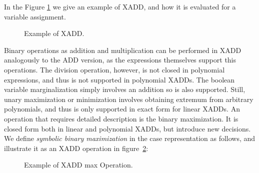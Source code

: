 In the Figure \ref{fig:xaddex} we give an example of XADD, and how it is evaluated for a variable assignment.

\begin{figure}[h!t]
\center
{}
\caption{ Example of XADD.}
\label{fig:xaddex} 
\end{figure}

Binary operations as addition and multiplication can be performed in XADD analogously  to the ADD version, as the expressions themselves support this operations. The division operation, however, is not closed in polynomial expressions, and thus is not supported in polynomial XADDs. The boolean variable marginalization simply involves an addition so is also supported. Still, unary maximization or minimization involves obtaining extremum from arbitrary polynomials, and thus is only supported in exact form for linear XADDs. An operation that requires detailed description is the binary maximization. It is closed form both in linear and polynomial XADDs, but introduce new decisions. We define \emph{symbolic binary maximization} in the case representation as follows, and illustrate it as an XADD operation in figure~\ref{fig:xaddmax}:

\begin{figure}[h!t]
\center
{}
\caption{ Example of XADD max Operation.}
\label{fig:xaddmax} 
\end{figure}


